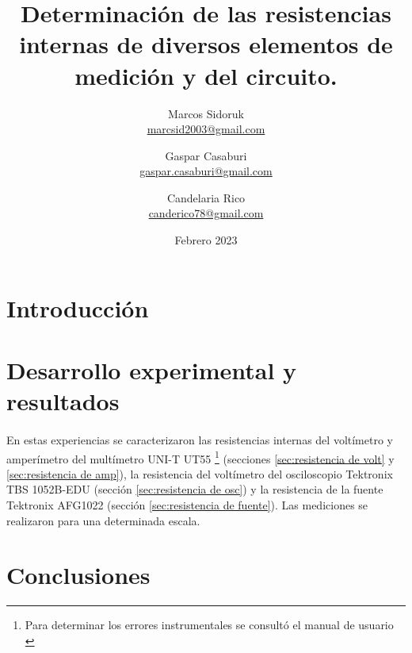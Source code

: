 \documentclass{article}
\title{Determinación de las resistencias internas de diversos elementos de medición y del circuito.}
\author{Marcos Sidoruk \\ \href{mailto:marcsid2003@gmail.com}{marcsid2003@gmail.com} \and Gaspar Casaburi \\ \href{mailto:gaspar.casaburi@gmail.com}{gaspar.casaburi@gmail.com} \and Candelaria Rico \\ \href{mailto:canderico78@gmail.com}{canderico78@gmail.com}}
\date{Febrero 2023}
\begin{document}
\maketitle

\begin{abstract}
    
\end{abstract}

\section{Introducción}



\section{Desarrollo experimental y resultados}

\paragraph{}
En estas experiencias se caracterizaron las resistencias internas del voltímetro y amperímetro del multímetro UNI-T UT55 \footnote{Para determinar los errores instrumentales se consultó el manual de usuario \cite{manual_multimetro}} (secciones \ref{sec:resistencia de volt} y \ref{sec:resistencia de amp}), la resistencia del voltímetro del osciloscopio Tektronix TBS 1052B-EDU (sección \ref{sec:resistencia de osc}) y la resistencia de la fuente Tektronix AFG1022 (sección \ref{sec:resistencia de fuente}). Las mediciones se realizaron para una determinada escala.






\section{Conclusiones}



\printbibliography
\end{document}
